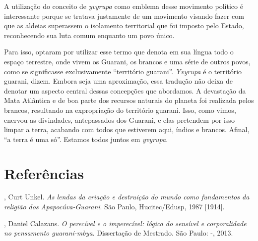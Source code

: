 A utilização do conceito de \emph{yvyrupa} como emblema desse movimento
político é interessante porque se tratava justamente de um movimento
visando fazer com que as aldeias superassem o isolamento territorial
que foi imposto pelo Estado, reconhecendo sua luta comum enquanto um
povo único.

Para isso, optaram por utilizar esse termo que denota em sua língua todo
o espaço terrestre, onde vivem os Guarani, os brancos e uma série de
outros povos, como se significasse exclusivamente ``território guarani''.
\emph{Yvyrupa} é o território guarani, dizem. Embora seja uma aproximação,
essa tradução não deixa de denotar um aspecto central dessas concepções
que abordamos. A devastação da Mata Atlântica e de boa parte dos
recursos naturais do planeta foi realizada pelos brancos, resultando na
expropriação do território guarani. Isso, como vimos, enervou as
divindades, antepassados dos Guarani, e elas pretendem por isso limpar
a terra, acabando com todos que estiverem aqui, índios e brancos.
Afinal, ``a terra é uma só''. Estamos todos juntos em \emph{yvyrupa}.

\section{Referências}

\begin{Parskip}
, Curt Unkel. \emph{As lendas da criação e destruição do mundo
como fundamentos da religião dos Apapocúva-Guarani}. São Paulo,
Hucitec/Edusp, 1987 [1914].

, Daniel Calazans. \emph{O perecível e o imperecível: lógica do
sensível e corporalidade no pensamento guarani-mbya}. Dissertação de
Mestrado. São Paulo: -, 2013.
\end{Parskip}

\pagebreak


